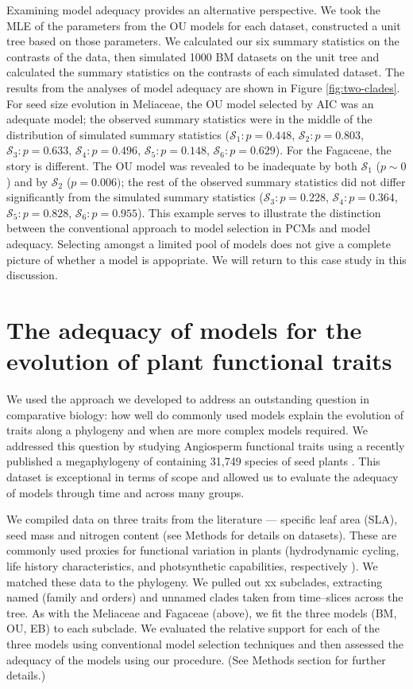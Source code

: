 \documentclass[a4paper,12pt]{article}
\begin{document}
Examining model adequacy provides an alternative perspective. We took the MLE of the parameters from the OU models for each dataset, constructed a unit tree based on those parameters. We calculated our six summary statistics on the contrasts of the data, then simulated 1000 BM datasets on the unit tree and calculated the summary statistics on the contrasts of each simulated dataset. The results from the analyses of model adequacy are shown in Figure \ref{fig:two-clades}. For seed size evolution in Meliaceae, the OU model selected by AIC was an adequate model; the observed summary statistics were in the middle of the distribution of simulated summary statistics ($\mathcal{S}_1: p=0.448$, $\mathcal{S}_2: p=0.803$, $\mathcal{S}_3: p=0.633$, $\mathcal{S}_4:p=0.496$, $\mathcal{S}_5: p=0.148$, $\mathcal{S}_6: p=0.629$). For the Fagaceae, the story is different. The OU model was revealed to be inadequate by both $\mathcal{S}_1$ ($p \sim 0$) and by $\mathcal{S}_2$ ($p=0.006)$; the rest of the observed summary statistics did not differ significantly from the simulated summary statistics ($\mathcal{S}_3: p=0.228$, $\mathcal{S}_4:p=0.364$, $\mathcal{S}_5: p=0.828$, $\mathcal{S}_6: p=0.955$). This example serves to illustrate the distinction between the conventional approach to model selection in PCMs and model adequacy. Selecting amongst a limited pool of models does not give a complete picture of whether a model is appopriate. We will return to this case study in this discussion.


\section{The adequacy of models for the evolution of plant functional traits}

We used the approach we developed to address an outstanding question in comparative biology: how well do commonly used models explain the evolution of traits along a phylogeny and when are more complex models required. We addressed this question by studying Angiosperm functional traits using a recently published a megaphylogeny of containing 31,749 species of seed plants \citep{Zanne2013}. This dataset is exceptional in terms of scope and allowed us to evaluate the adequacy of models through time and across many groups.  

We compiled data on three traits from the literature --- specific leaf area (SLA), seed mass and nitrogen content (see Methods for details on datasets). These are commonly used proxies for functional variation in plants (hydrodynamic cycling, life history characteristics, and photsynthetic capabilities, respectively \citep{Westoby2002}). We  matched these data to the phylogeny. We pulled out xx subclades, extracting named (family and orders) and unnamed clades taken from time--slices across the tree. As with the Meliaceae and Fagaceae (above), we fit the three models (BM, OU, EB) to each subclade. We evaluated the relative support for each of the three models using conventional model selection techniques and then assessed the adequacy of the models using our procedure. (See Methods section for further details.) 
\end{document}
